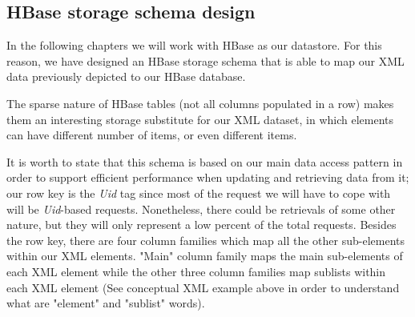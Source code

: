 

\subsection{HBase storage schema design}

In the following chapters we will work with HBase as our datastore. For this reason, we have designed an HBase storage schema that is able to map our XML data previously depicted to our HBase database. 

\par
The sparse nature of HBase tables (not all columns populated in a row) makes them an interesting storage substitute for our XML dataset, in which elements can have different number of items, or even different items.

\par
It is worth to state that this schema is based on our main data access pattern in order to support efficient performance when updating and retrieving data from it; our row key is the \textit{Uid} tag since most of the request we will have to cope with will be \textit{Uid}-based requests. Nonetheless, there could be retrievals of some other nature, but they will only represent a low percent of the total requests.  Besides the row key, there are four column families which map all the other sub-elements within our XML elements. "Main" column family maps the main sub-elements of each XML element while the other three column families map sublists within each XML element (See conceptual XML example above in order to understand what are "element" and "sublist" words). 




